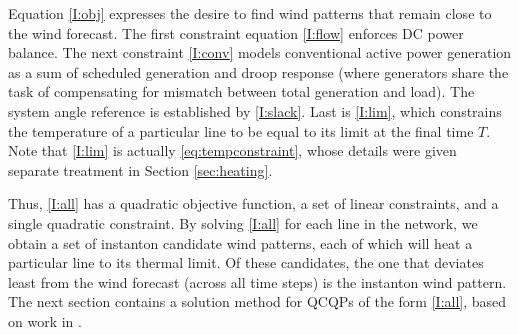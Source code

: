 \documentclass[conference]{IEEEtran}
\begin{document}
Equation \eqref{I:obj} expresses the desire to find wind patterns that
remain close to the wind forecast. The first constraint equation
\eqref{I:flow} enforces DC power balance. The next constraint
\eqref{I:conv} models conventional active power generation as a sum of
scheduled generation and droop response (where generators share the
task of compensating for mismatch between total generation and
load). The system angle reference is established by
\eqref{I:slack}. Last is \eqref{I:lim}, which constrains the
temperature of a particular line to be equal to its limit at the final
time $T$. Note that \eqref{I:lim} is actually \eqref{eq:tempconstraint}, whose details were given separate treatment in Section \ref{sec:heating}.

Thus, \eqref{I:all} has a quadratic objective function, a set of linear constraints, and a single quadratic constraint. By solving \eqref{I:all} for each line in the network, we obtain a set of instanton candidate wind patterns, each of which will heat a particular line to its thermal limit. Of these candidates, the one that deviates least from the wind forecast (across all time steps) is the instanton wind pattern. The next section contains a solution method for QCQPs of the form \eqref{I:all}, based on work in \cite{bienstock2014}.
\end{document}
